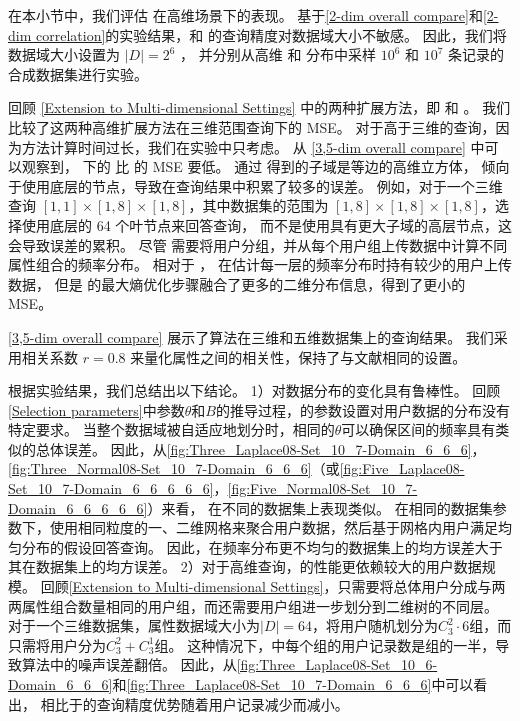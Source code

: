 在本小节中，我们评估 \myahead 在高维场景下的表现。
基于\autoref{2-dim overall compare}和\autoref{2-dim correlation}的实验结果，\myHDG 和 \myahead 的查询精度对数据域大小不敏感。
因此，我们将数据域大小设置为 $|D|=2^6$ ，
并分别从高维 \Laplacian 和 \Gaussian 分布中采样 $10^6$ 和 $10^7$ 条记录的合成数据集进行实验。

回顾 \autoref{Extension to Multi-dimensional Settings} 中的两种扩展方法，即 \de 和 \lle。
我们比较了这两种高维扩展方法在三维范围查询下的 MSE。
对于高于三维的查询，因为\de 方法计算时间过长，我们在实验中只考虑\lle。
从 \autoref{3,5-dim overall compare} 中可以观察到，
\lle 下的 \myahead 比 \de 的 MSE 要低。
通过 \de 得到的子域是等边的高维立方体，
\myahead 倾向于使用底层的节点，导致在查询结果中积累了较多的误差。
例如，对于一个三维查询 $[1,1]\times[1,8]\times[1,8]$，其中数据集的范围为 $[1,8]\times[1,8]\times[1,8]$，\myahead 选择使用底层的 64 个叶节点来回答查询，
而不是使用具有更大子域的高层节点，这会导致误差的累积。
尽管 \lle 需要将用户分组，并从每个用户组上传数据中计算不同属性组合的频率分布。
相对于 \de， \lle 在估计每一层的频率分布时持有较少的用户上传数据，
但是 \lle 的最大熵优化步骤融合了更多的二维分布信息，得到了更小的 MSE。

\autoref{3,5-dim overall compare} 展示了算法在三维和五维数据集上的查询结果。
我们采用相关系数 $r=0.8$ 来量化属性之间的相关性，保持了与文献{\rm\parencite{yang2020answering}}相同的设置。

根据实验结果，我们总结出以下结论。
1）\myahead 对数据分布的变化具有鲁棒性。
回顾\autoref{Selection parameters}中参数$\theta$和$B$的推导过程，\myahead 的参数设置对用户数据的分布没有特定要求。
当整个数据域被自适应地划分时，相同的$\theta$可以确保区间的频率具有类似的总体误差。
因此，从\autoref{fig:Three_Laplace08-Set_10_7-Domain_6_6_6}，\autoref{fig:Three_Normal08-Set_10_7-Domain_6_6_6}（或\autoref{fig:Five_Laplace08-Set_10_7-Domain_6_6_6_6_6}，\autoref{fig:Five_Normal08-Set_10_7-Domain_6_6_6_6_6}）来看，
\myahead 在不同的数据集上表现类似。
在相同的数据集参数下，\myHDG 使用相同粒度的一、二维网格来聚合用户数据，然后基于网格内用户满足均匀分布的假设回答查询。
因此，\myHDG 在频率分布更不均匀的\Laplacian 数据集上的均方误差大于其在\Gaussian 数据集上的均方误差。
2）对于高维查询，\myahead 的性能更依赖较大的用户数据规模。
回顾\autoref{Extension to Multi-dimensional Settings}，\myHDG 只需要将总体用户分成与两两属性组合数量相同的用户组，而\myahead 还需要用户组进一步划分到二维树的不同层。
对于一个三维数据集，属性数据域大小为$|D|=64$，\myahead 将用户随机划分为$C_3^2 \cdot 6$组，而\myHDG 只需将用户分为$C_3^2 + C_3^1$组。
这种情况下，\myahead 中每个组的用户记录数是\myHDG 组的一半，导致\myahead 算法中的噪声误差翻倍。
因此，从\autoref{fig:Three_Laplace08-Set_10_6-Domain_6_6_6}和\autoref{fig:Three_Laplace08-Set_10_7-Domain_6_6_6}中可以看出，
\myahead 相比于\myHDG 的查询精度优势随着用户记录减少而减小。

